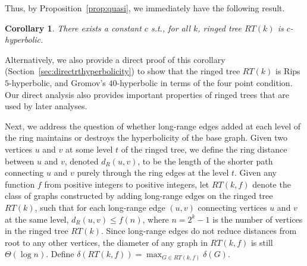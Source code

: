 \documentclass[11pt]{article}
\newtheorem{coro}[lem]{Corollary}
\begin{document}
\noindent
Thus, by Proposition~\ref{prop:quasi}, we immediately have the following result.

\begin{coro}\label{cor:ringed-tree-constant}
There exists a constant $c$ 
s.t.,
for all $k$,
	ringed tree $RT(k)$ is $c$-hyperbolic.
\end{coro}

\noindent
Alternatively, we also provide a direct proof of this corollary
	(Section~\ref{sec:directrthyperbolicity}) 
to show that the ringed tree $RT(k)$ is Rips $5$-hyperbolic,
	and Gromov's $40$-hyperbolic
	in terms of the four point condition.
Our direct analysis also provides important properties of ringed trees that
	are used by later analyses.


Next, we address the question of whether long-range edges added at each 
level of the ring maintains or destroys the hyperbolicity of the base graph.
Given two vertices $u$ and $v$ at some level $t$ of the ringed tree, 
	we define the ring distance between $u$ and $v$, denoted $d_R(u,v)$,
	to be the length of the shorter path connecting $u$ and $v$ purely
	through the ring edges at the level $t$.
Given any function $f$ from positive integers to positive integers, 
	let $RT(k,f)$ denote the class of graphs constructed by adding
	long-range edges on the ringed tree $RT(k)$, such that for 
	each long-range edge $(u,v)$ connecting vertices $u$ and $v$ at the
	same level, $d_R(u,v) \le f(n)$, where $n=2^{k}-1$ is the number of
	vertices in the ringed tree $RT(k)$.
Since long-range edges do not reduce distances from root to any other
	vertices, the diameter of any graph in $RT(k,f)$ is still 
	$\Theta(\log n)$.
Define $\delta(RT(k,f)) = \max_{G\in RT(k,f)} \delta(G)$.
\end{document}
